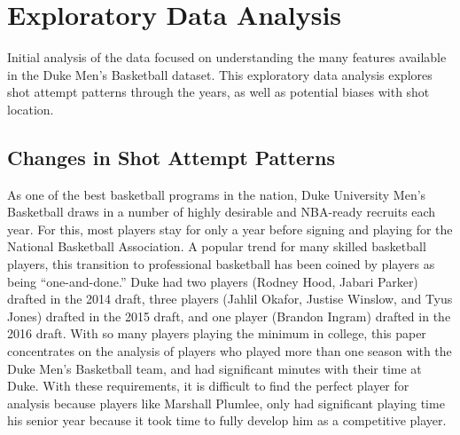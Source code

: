 \documentclass[12pt,twoside]{dukestatscithesis}
\theoremstyle{definition}
\theoremstyle{definition}
\theoremstyle{definition}
\theoremstyle{remark}
\begin{document}
\chapter{Exploratory Data Analysis}\label{exploratory-data-analysis}

Initial analysis of the data focused on understanding the many features
available in the Duke Men's Basketball dataset. This exploratory data
analysis explores shot attempt patterns through the years, as well as
potential biases with shot location.

\section{Changes in Shot Attempt
Patterns}\label{changes-in-shot-attempt-patterns}

As one of the best basketball programs in the nation, Duke University
Men's Basketball draws in a number of highly desirable and NBA-ready
recruits each year. For this, most players stay for only a year before
signing and playing for the National Basketball Association. A popular
trend for many skilled basketball players, this transition to
professional basketball has been coined by players as being
``one-and-done.'' Duke had two players (Rodney Hood, Jabari Parker)
drafted in the 2014 draft, three players (Jahlil Okafor, Justise
Winslow, and Tyus Jones) drafted in the 2015 draft, and one player
(Brandon Ingram) drafted in the 2016 draft. With so many players playing
the minimum in college, this paper concentrates on the analysis of
players who played more than one season with the Duke Men's Basketball
team, and had significant minutes with their time at Duke. With these
requirements, it is difficult to find the perfect player for analysis
because players like Marshall Plumlee, only had significant playing time
his senior year because it took time to fully develop him as a
competitive player.
\end{document}
